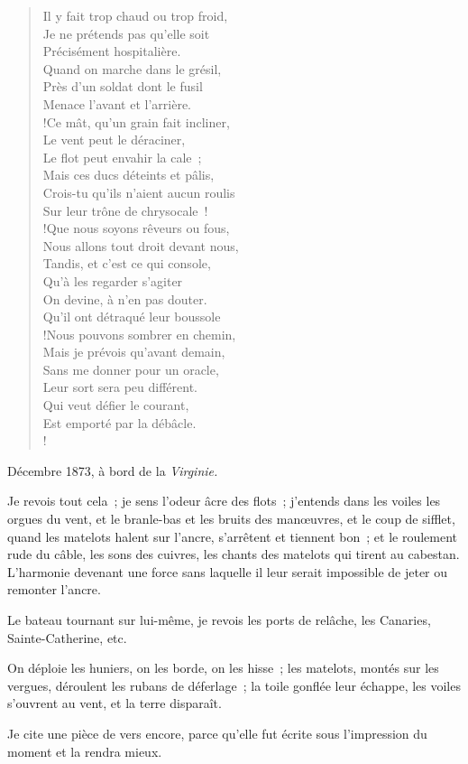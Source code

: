 \documentclass[french,twoside]{book} %
\newcommand{\signed}[1]{\bigbreak\filbreak{\raggedleft #1\par}\medskip}
\newenvironment{quoteblock}%
  {\begin{quoting}}
  {\end{quoting}}
\newenvironment{quotebar}{%
    \def\FrameCommand{{\color{rubric!10!}\vrule width 0.5em} \hspace{0.9em}}%
    \def\OuterFrameSep{\itemsep} %
    \MakeFramed {\advance\hsize-\width \FrameRestore}
  }%
  {%
    \endMakeFramed
  }
\renewenvironment{quoteblock}%
  {%
    \savenotes
    \setstretch{0.9}
    \normalfont
    \begin{quotebar}
  }
  {%
    \end{quotebar}
    \spewnotes
  }
\begin{document}
\begin{verse}
Il y fait trop chaud ou trop froid,\\
Je ne prétends pas qu’elle soit\\
Précisément hospitalière.\\
Quand on marche dans le grésil,\\
Près d’un soldat dont le fusil\\
Menace l’avant et l’arrière.\\!Ce mât, qu’un grain fait incliner,\\
Le vent peut le déraciner,\\
Le flot peut envahir la cale ;\\
Mais ces ducs déteints et pâlis,\\
Crois-tu qu’ils n’aient aucun roulis\\
Sur leur trône de chrysocale !\\!Que nous soyons rêveurs ou fous,\\
Nous allons tout droit devant nous,\\
Tandis, et c’est ce qui console,\\
Qu’à les regarder s’agiter\\
On devine, à n’en pas douter.\\
Qu’il ont détraqué leur boussole\\!Nous pouvons sombrer en chemin,\\
Mais je prévois qu’avant demain,\\
Sans me donner pour un oracle,\\
Leur sort sera peu différent.\\
Qui veut défier le courant,\\
Est emporté par la débâcle.\\!
\end{verse}
\begin{quoteblock}
\noindent Décembre 1873, à bord de la \emph{Virginie.}\par


\signed{H{\scshape enri} R{\scshape ochefort}.}
\end{quoteblock}

\noindent Je revois tout cela ; je sens l’odeur âcre des flots ; j’entends dans les voiles les orgues du  vent, et le branle-bas et les bruits des manœuvres, et le coup de sifflet, quand les matelots halent sur l’ancre, s’arrêtent et tiennent bon ; et le roulement rude du câble, les sons des cuivres, les chants des matelots qui tirent au cabestan. L’harmonie devenant une force sans laquelle il leur serait impossible de jeter ou remonter l’ancre.\par
Le bateau tournant sur lui-même, je revois les ports de relâche, les Canaries, Sainte-Catherine, etc.\par
On déploie les huniers, on les borde, on les hisse ; les matelots, montés sur les vergues, déroulent les rubans de déferlage ; la toile gonflée leur échappe, les voiles s’ouvrent au vent, et la terre disparaît.\par
Je cite une pièce de vers encore, parce qu’elle fut écrite sous l’impression du moment et la rendra mieux.\par
\end{document}
